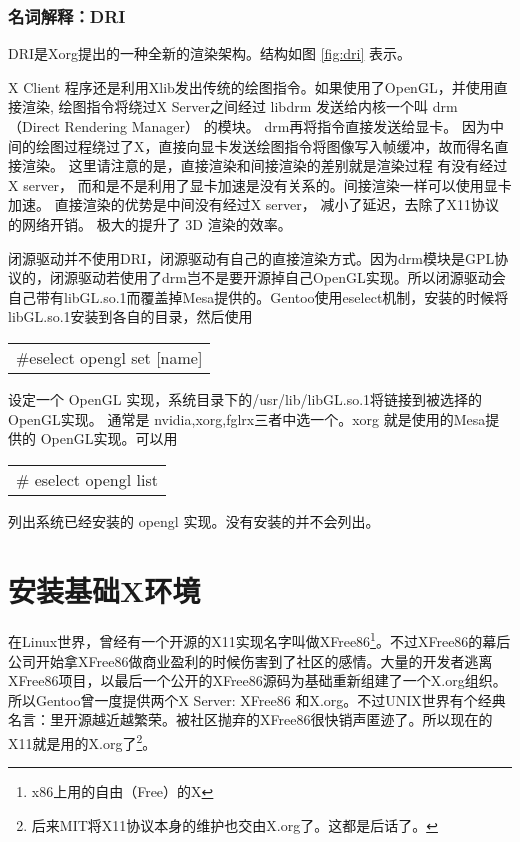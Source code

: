 \documentclass[amstex,twoside]{ctexbook}
\newenvironment{insertnote}{ \ttfamily\CJKfamily{KaiTi} }{\vskip 0.5cm }
\newenvironment{code}{\small\tt\begin{longtable}{p{0.8\textwidth}}}{\end{longtable}}
\begin{document}
\begin{insertnote}

\subsubsection{名词解释：DRI}

DRI是Xorg提出的一种全新的渲染架构。结构如图 \ref{fig:dri} 表示。



X Client 程序还是利用Xlib发出传统的绘图指令。如果使用了OpenGL，并使用直接渲染, 绘图指令将绕过X Server之间经过 libdrm 发送给内核一个叫 drm （Direct Rendering Manager） 的模块。
drm再将指令直接发送给显卡。 因为中间的绘图过程绕过了X，直接向显卡发送绘图指令将图像写入帧缓冲，故而得名直接渲染。 这里请注意的是，直接渲染和间接渲染的差别就是渲染过程 有没有经过X server， 而和是不是利用了显卡加速是没有关系的。间接渲染一样可以使用显卡加速。 直接渲染的优势是中间没有经过X server， 减小了延迟，去除了X11协议的网络开销。
极大的提升了 3D 渲染的效率。


闭源驱动并不使用DRI，闭源驱动有自己的直接渲染方式。因为drm模块是GPL协议的，闭源驱动若使用了drm岂不是要开源掉自己OpenGL实现。所以闭源驱动会自己带有libGL.so.1而覆盖掉Mesa提供的。Gentoo使用eselect机制，安装的时候将libGL.so.1安装到各自的目录，然后使用
\begin{code}
\#eselect opengl set [name] 
\end{code}
设定一个 OpenGL 实现，系统目录下的/usr/lib/libGL.so.1将链接到被选择的OpenGL实现。
通常是 nvidia,xorg,fglrx三者中选一个。xorg 就是使用的Mesa提供的 OpenGL实现。可以用
\begin{code}
\# eselect opengl list
\end{code}
 列出系统已经安装的 opengl 实现。没有安装的并不会列出。

\end{insertnote}

\section{安装基础X环境}


在Linux世界，曾经有一个开源的X11实现名字叫做XFree86\footnote{x86上用的自由（Free）的X}。不过XFree86的幕后公司开始拿XFree86做商业盈利的时候伤害到了社区的感情。大量的开发者逃离XFree86项目，以最后一个公开的XFree86源码为基础重新组建了一个X.org组织。所以Gentoo曾一度提供两个X Server: XFree86 和X.org。不过UNIX世界有个经典名言：里开源越近越繁荣。被社区抛弃的XFree86很快销声匿迹了。所以现在的X11就是用的X.org了\footnote{后来MIT将X11协议本身的维护也交由X.org了。这都是后话了。}。
\end{document}
